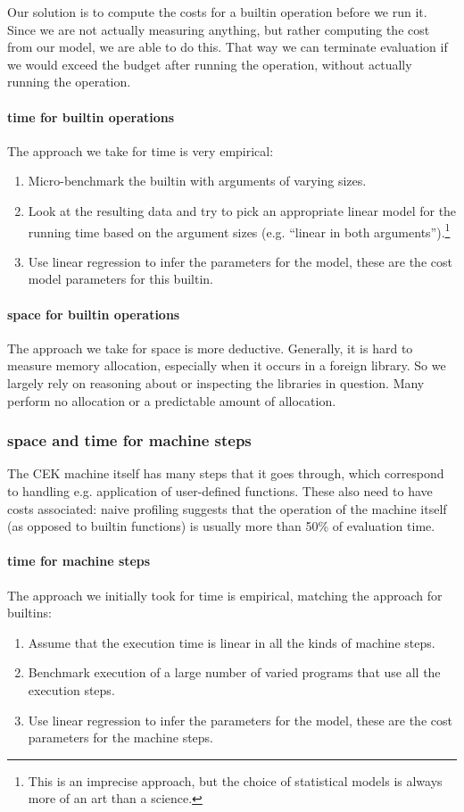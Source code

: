 Our solution is to compute the costs for a builtin operation before we run it.
Since we are not actually measuring anything, but rather computing the cost from our model, we are able to do this.
That way we can terminate evaluation if we would exceed the budget after running the operation, without actually running the operation.

\paragraph{\gls{time} for builtin operations}
The approach we take for \gls{time} is very empirical:
\begin{enumerate}
\item
  Micro-benchmark the builtin with arguments of varying sizes.
\item
  Look at the resulting data and try to pick an appropriate linear model for the running time based on the argument sizes (e.g. ``linear in both arguments'').\footnote{
  This is an imprecise approach, but the choice of statistical models is always more of an art than a science.
  }
\item
  Use linear regression to infer the parameters for the model, these are the cost model parameters for this builtin.
\end{enumerate}

\paragraph{\gls{space} for builtin operations}
The approach we take for \gls{space} is more deductive.
Generally, it is hard to measure memory allocation, especially when it occurs in a foreign library.
So we largely rely on reasoning about or inspecting the libraries in question.
Many perform no allocation or a predictable amount of allocation.

\subsubsection{\gls{space} and \gls{time} for machine steps}
The CEK machine itself has many steps that it goes through, which correspond to handling e.g. application of user-defined functions.
These also need to have costs associated: naive profiling suggests that the operation of the machine itself (as opposed to builtin functions) is usually more than 50\% of evaluation time.

\paragraph{\gls{time} for machine steps}
The approach we initially took for \gls{time} is empirical, matching the approach for builtins:
\begin{enumerate}
\item Assume that the execution time is linear in all the kinds of machine steps.
\item Benchmark execution of a large number of varied programs that use all the execution steps.
\item Use linear regression to infer the parameters for the model, these are the cost parameters for the machine steps.
\end{enumerate}

